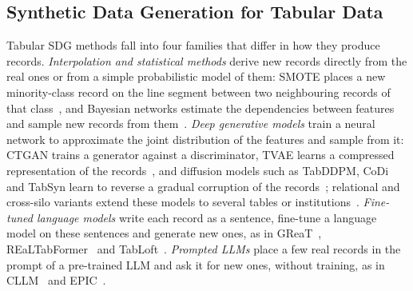 \documentclass[conference]{IEEEtran}
\begin{document}
\subsection{Synthetic Data Generation for Tabular Data}
Tabular SDG methods fall into four families that differ in how they produce records. \emph{Interpolation and statistical methods} derive new records directly from the real ones or from a simple probabilistic model of them: SMOTE places a new minority-class record on the line segment between two neighbouring records of that class~\cite{chawla2002smote}, and Bayesian networks estimate the dependencies between features and sample new records from them~\cite{zhang2014privbayes,cai2021privmrf}. \emph{Deep generative models} train a neural network to approximate the joint distribution of the features and sample from it: CTGAN trains a generator against a discriminator, TVAE learns a compressed representation of the records~\cite{xu2019ctgan}, and diffusion models such as TabDDPM, CoDi and TabSyn learn to reverse a gradual corruption of the records~\cite{kotelnikov2023tabddpm,lee2023codi,zhang2024tabsyn}; relational and cross-silo variants extend these models to several tables or institutions~\cite{fan2020relational,shankar2024silofuse}. \emph{Fine-tuned language models} write each record as a sentence, fine-tune a language model on these sentences and generate new ones, as in GReaT~\cite{borisov2023great}, REaLTabFormer~\cite{solatorio2023realtabformer} and TabLoft~\cite{chen2026tabloft}. \emph{Prompted LLMs} place a few real records in the prompt of a pre-trained LLM and ask it for new ones, without training, as in CLLM~\cite{seedat2024cllm} and EPIC~\cite{kim2024epic}.
\end{document}
